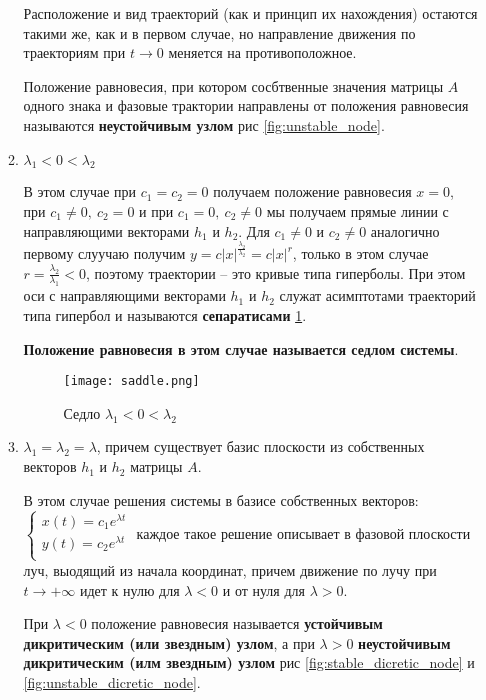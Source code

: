 \begin{enumerate}
\begin{enumerate}
    Расположение и вид траекторий (как и принцип их нахождения) остаются такими же, как и в первом случае, но направление движения по траекториям при $t \rightarrow 0$ меняется на противоположное.

    \begin{definition}
      Положение равновесия, при котором сосбтвенные значения матрицы $A$ одного знака и фазовые трактории направлены от положения равновесия называются \textbf{неустойчивым узлом} рис \ref{fig:unstable_node}.
    \end{definition}

    \item $\lambda_1 < 0 < \lambda_2$
    
    В этом случае при $c_1 = c_2 = 0$ получаем положение равновесия $x = 0$, при $c_1 \neq 0, ~ c_2 = 0$ и при $c_1 = 0, ~ c_2 \neq 0$ мы получаем прямые линии с направляющими векторами $h_1$ и $h_2$. Для $c_1 \neq 0$ и $c_2 \neq 0$ аналогично первому слуучаю получим $\displaystyle y = c |x|^{\frac{\lambda_2}{\lambda_2}} = c |x|^r$, только в этом случае $\displaystyle r = \frac{\lambda_2}{\lambda_1} < 0$, поэтому траектории -- это кривые типа гиперболы. При этом оси с направляющими векторами $h_1$ и $h_2$ служат асимптотами траекторий типа гипербол и называются \textbf{сепаратисами} \ref{fig:saddle}.

    \textbf{Положение равновесия в этом случае называется седлом системы}.

    \begin{figure}[h!]
      \centering
      \texttt{[image: saddle.png]}
      \caption{Седло $\lambda_1 < 0 < \lambda_2$}
      \label{fig:saddle}
    \end{figure}

    \item $\lambda_1 = \lambda_2 = \lambda$, причем существует базис плоскости из собственных векторов $h_1$ и $h_2$ матрицы $A$.
    
    В этом случае решения системы в базисе собственных векторов:
    $\begin{cases}
      x(t) = c_1 e^{\lambda t} \\
      y(t) = c_2 e^{\lambda t} \\
    \end{cases}$
    каждое такое решение описывает в фазовой плоскости луч, выодящий из начала координат, причем движение по лучу при $t \rightarrow + \infty$ идет к нулю для $\lambda < 0$ и от нуля для $\lambda > 0$.

    При $\lambda < 0$ положение равновесия называется \textbf{устойчивым дикритическим (или звездным) узлом}, а при $\lambda > 0$ \textbf{неустойчивым дикритическим (илм звездным) узлом} рис \ref{fig:stable_dicretic_node} и \ref{fig:unstable_dicretic_node}.


\end{enumerate}
\end{enumerate}
